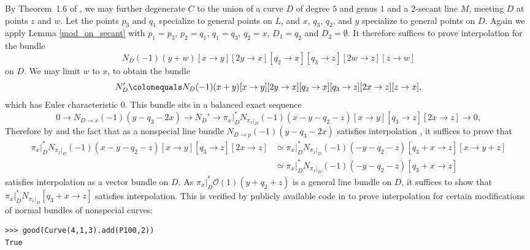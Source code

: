 \documentclass[11pt]{amsart}
\renewcommand{\O}{\mathcal{O}}
\renewcommand{\bar}{\overline}
\theoremstyle{definition}
\theoremstyle{remark}
\begin{document}
By Theorem~1.6 of \cite{rbn}, we may further degenerate $C$
to the union of a curve $D$ of degree $5$ and genus $1$ and a $2$-secant line $M$, meeting $D$ at points $z$ and $w$.  Let the points $p_3$ and $q_1$ specialize to general points on $L$, and $x$, $q_3$, $q_2$, and $y$ specialize to general points on $D$.  Again we apply Lemma \ref{mod_on_secant} with $p_1 = p_3$, $p_2 = q_1$, $q_1 = q_3$, $q_2 = x$, $D_1 = q_2$ and $D_2 = \emptyset$.  It therefore suffices to prove interpolation for the bundle
\[N_D(-1)(y+w)[x\to y][2y \to x][q_2 \to x][q_3 \to z][2w \to z][z \to w] \]
on $D$.  We may limit $w$ to $x$, to obtain the bundle
\[N_D' \colonequals N_D(-1)(x+y)[x\to y][2y \to x][q_2 \to x][q_3 \to z][2x \to z][z \to x], \]
which has Euler characteristic $0$.  This bundle sits in a balanced exact sequence
\[0 \to N_{D \to x}(-1)(y-q_3 -2x) \to N_D' \to \pi_x|_{D}^*N_{\pi_x|_{D}}(-1)(x-y-q_2-z)[x\to y][q_3 \to z][2x \to z] \to 0, \]
Therefore by \cite[Proposition 4.16]{joint} and the fact that as a nonspecial line bundle $N_{D \to p}(-1)(y-q_3-2x)$ satisfies interpolation \cite[Propsition 4.7]{joint}, it suffices to prove that 
\begin{align*}
\pi_x|_{D}^*N_{\pi_x|_{D}}(-1)(x-y-q_2-z)[x\to y][q_3 \to z][2x \to z] & \simeq \pi_x|_{D}^*N_{\pi_x|_{D}}(-1)(-y-q_2-z)[q_3 + x \to z][x \to y + z] \\ &\simeq \pi_x|_{D}^*N_{\pi_x|_{D}}(-1)(-y-q_2-z)[q_3 + x \to z]
\end{align*}
satisfies interpolation as a vector bundle on $D$.  As $\pi_x|_{D}^*\O(1)(y + q_2 + z)$ is a general line bundle on $D$, it suffices to show that $\pi_x|_{D}^*N_{\pi_x|_{D}}[q_3 + x \to z]$ satisfies interpolation.
This is verified by publicly available code in \cite[Appendix B]{joint}
to prove interpolation for
certain modifications of normal bundles of nonspecial curves:

\begin{verbatim}
>>> good(Curve(4,1,3).add(P100,2))
True
\end{verbatim}

\end{document}
